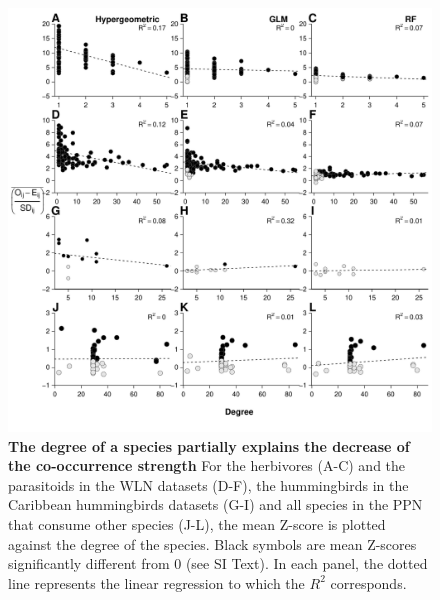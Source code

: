\newpage

\begin{figure}[htbp]
\centering
\includegraphics[width=\textwidth]{chapitre3/figS7.pdf}
\caption[The degree of species partially explains the decrease
of the co-occurrence strength]{\textbf{The degree of a species partially
explains the decrease of the co-occurrence strength} For the herbivores (A-C) and the
parasitoids in the WLN datasets (D-F), the hummingbirds
in the Caribbean hummingbirds datasets (G-I) and all species in the
PPN that consume other species (J-L), the mean Z-score
is plotted against the degree of the species. Black symbols are mean
Z-scores significantly different from 0 (see SI Text). In each panel,
the dotted line represents the linear regression to which the \(R^2\)
corresponds. \label{fig:degree}}
\end{figure}

\newpage

